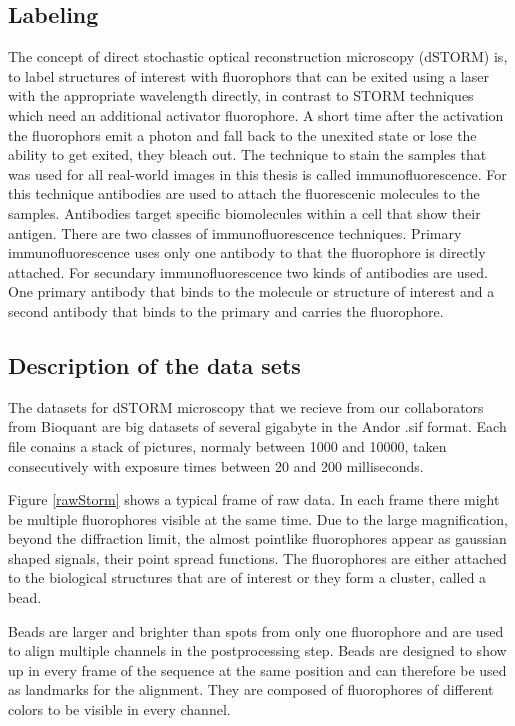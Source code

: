 \subsection{Labeling}
The concept of direct stochastic optical reconstruction microscopy (dSTORM) \cite{heilemann} is, to label structures of interest with fluorophors that can be exited using a laser with the appropriate wavelength directly, in contrast to STORM techniques which need an additional activator fluorophore. A short time after the activation the fluorophors emit a photon and fall back to the unexited state or lose the ability to get exited, they bleach out.\newline
The technique to stain the samples that was used for all real-world images in this thesis is called immunofluorescence. For this technique antibodies are used to attach the fluorescenic molecules to the samples. Antibodies target specific biomolecules within a cell that show their antigen. There are two classes of immunofluorescence techniques.\newline
Primary immunofluorescence uses only one antibody to that the fluorophore is directly attached.\newline
For secundary immunofluorescence two kinds of antibodies are used. One primary antibody that binds to the molecule or structure of interest and a second antibody that binds to the primary and carries the fluorophore.
\subsection{Description of the data sets}
The datasets for dSTORM microscopy that we recieve from our collaborators from
Bioquant are big datasets of several gigabyte in the Andor .sif format. Each
file conains a stack of pictures, normaly between 1000 and 10000, taken
consecutively with exposure times between 20 and 200 milliseconds.\newline

Figure \ref{rawStorm} shows a typical frame of raw data. In each frame there might be multiple fluorophores visible at the same time. Due to the large magnification, beyond the diffraction limit, the almost pointlike fluorophores appear as gaussian shaped signals, their point spread functions. The fluorophores are either attached to the biological structures that are of interest or they form a cluster, called a bead.\newline

Beads are larger and brighter than spots from only one fluorophore and are used to align multiple channels in the postprocessing step. Beads are designed to show up in every frame of the sequence at the same position and can therefore be used as landmarks for the alignment. They are composed of fluorophores of different colors to be visible in every channel.\newline

